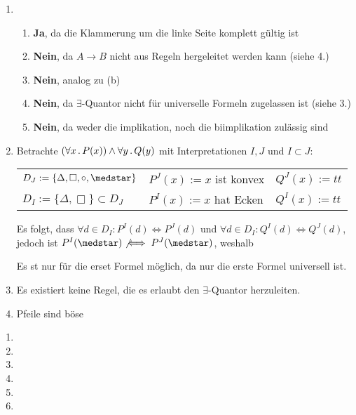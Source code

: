 \begin{enumerate}
	\item 
	
	\begin{enumerate}
		\item \textbf{Ja}, da die Klammerung um die linke Seite komplett gültig ist
		\item \textbf{Nein}, da $A \to B$ nicht aus Regeln hergeleitet werden kann (siehe 4.)
		\item \textbf{Nein}, analog zu (b)
		\item \textbf{Nein}, da $\exists$-Quantor nicht für universelle Formeln zugelassen ist (siehe 3.)
		\item \textbf{Nein}, da weder die implikation, noch die biimplikation zulässig sind
	\end{enumerate}	

	\item Betrachte $(\forall x \, . \, P(x))\land \forall y \, . \,Q(y)$ mit Interpretationen $I, J$ und $I \subset J$:
	
	\begin{tabular}{l l l}
		$D_J := \{\Delta, \Box, \circ, \medstar\}$ & $P^J(x) := x$ ist konvex & $Q^J(x) := tt$ \\
		$D_I := \{\Delta, \Box\} \subset D_J$ 		   & $P^I(x) := x$ hat Ecken & $Q^I(x) := tt$\\
	\end{tabular}
	
	Es folgt, dass $\forall d \in D_I : P^I(d) \iff P^J(d)$ und $\forall d \in D_I : Q^I(d) \iff Q^J(d)$, jedoch ist $P^I(\medstar) \not\iff P^J(\medstar)$, weshalb 
	
	\bigskip Es st nur für die erset Formel möglich, da nur die erste Formel universell ist.
	
	\item Es existiert keine Regel, die es erlaubt den $\exists$-Quantor herzuleiten.

	\item Pfeile sind böse

\end{enumerate}



\begin{enumerate}
	\item 
	\item 
	\item 
	\item 
	\item 
	\item 	
\end{enumerate}




